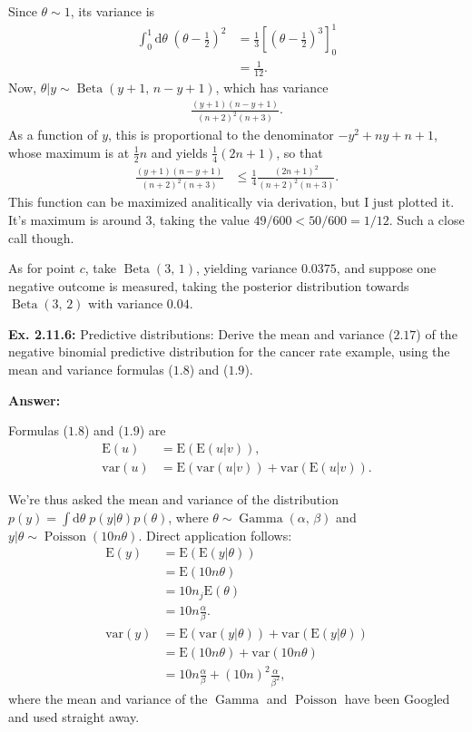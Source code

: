 \documentclass{article}
\newcommand\oname\operatorname
\begin{document}
Since $\theta\sim1$, its variance is
\begin{align*}
	\int_0^1\mathrm d\theta\;\left(\theta-\frac12\right)^2&=\frac13\left[\left(\theta-\frac12\right)^3\right]_0^1\\
	&=\frac1{12}.
\end{align*}
Now, $\theta|y\sim\oname{Beta}(y+1,\,n-y+1)$, which has variance
\begin{align*}
	\frac{(y+1)(n-y+1)}{(n+2)^2(n+3)}.
\end{align*}
As a function of $y$, this is proportional to the denominator $-y^2+ny+n+1$, whose maximum is at $\frac12n$ and yields $\frac14\left(2n+1\right)$, so that
\begin{align*}
	\frac{(y+1)(n-y+1)}{(n+2)^2(n+3)}&\leq\frac14\frac{\left(2n+1\right)^2}{\left(n+2\right)^2(n+3)}.
\end{align*}
This function can be maximized analitically via derivation, but I just plotted it. It's maximum is around $3$, taking the value $49/600<50/600=1/12$. Such a close call though.

As for point $c$, take $\oname{Beta}(3,\,1)$, yielding variance $0.0375$, and suppose one negative outcome is measured, taking the posterior distribution towards $\oname{Beta}(3,\,2)$ with variance $0.04$.

\textbf{Ex. 2.11.6: }Predictive distributions: Derive the mean and variance ($2.17$) of the negative binomial predictive distribution for the cancer rate example, using the mean and variance formulas ($1.8$) and ($1.9$).

\textbf{Answer:}

Formulas ($1.8$) and ($1.9$) are
\begin{align*}
	\mathrm E(u)&=\mathrm E(\mathrm E(u|v)),\\
	\mathrm{var}(u)&=\mathrm E(\mathrm{var}(u|v))+\mathrm{var}(\mathrm E(u|v)).
\end{align*}

We're thus asked the mean and variance of the distribution $p(y)=\int\mathrm d\theta\;p(y|\theta)p(\theta)$, where $\theta\sim\oname{Gamma}(\alpha,\,\beta)$ and $y|\theta\sim\oname{Poisson}(10n\theta)$. Direct application follows:
\begin{align*}
	\mathrm E(y)&=\mathrm E(\mathrm E(y|\theta))\\
	&=\mathrm E(10n\theta)\\
	&=10n_j\mathrm E(\theta)\\
	&=10n\frac\alpha\beta.\\
	\mathrm{var}(y)&=\mathrm E(\mathrm{var}(y|\theta))+\mathrm{var}(\mathrm E(y|\theta))\\
	&=\mathrm E(10n\theta)+\mathrm{var}(10n\theta)\\
	&=10n\frac\alpha\beta+(10n)^2\frac\alpha{\beta^2},
\end{align*}
where the mean and variance of the $\oname{Gamma}$ and $\oname{Poisson}$ have been Googled and used straight away.
\end{document}
